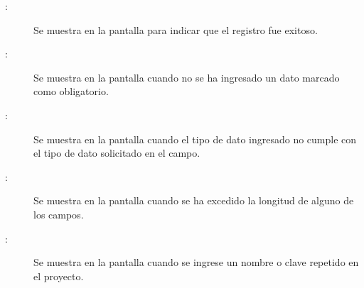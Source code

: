 \begin{description}
	\item[:] Se muestra en la pantalla  para indicar que el registro fue exitoso.
	\item[:] Se muestra en la pantalla  cuando no se ha ingresado un dato marcado como obligatorio.
	\item[:] Se muestra en la pantalla  cuando el tipo de dato ingresado no cumple con el tipo de dato solicitado en el campo.
	\item[:] Se muestra en la pantalla  cuando se ha excedido la longitud de alguno de los campos.
	\item[:] Se muestra en la pantalla  cuando se ingrese un nombre o clave repetido en el proyecto.
\end{description}
